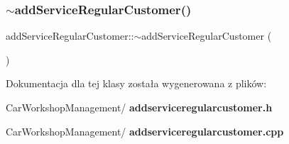 \mbox{\label{classadd_service_regular_customer_aebf18de8f2571369497cd8cd292ac520}} 
\subsubsection{$\sim$addServiceRegularCustomer()}
{\footnotesize\ttfamily add\+Service\+Regular\+Customer\+::$\sim$add\+Service\+Regular\+Customer (\begin{DoxyParamCaption}{ }\end{DoxyParamCaption})}



Dokumentacja dla tej klasy została wygenerowana z plików\+:\begin{DoxyCompactItemize}
\item 
Car\+Workshop\+Management/\textbf{ addserviceregularcustomer.\+h}\item 
Car\+Workshop\+Management/\textbf{ addserviceregularcustomer.\+cpp}\end{DoxyCompactItemize}
